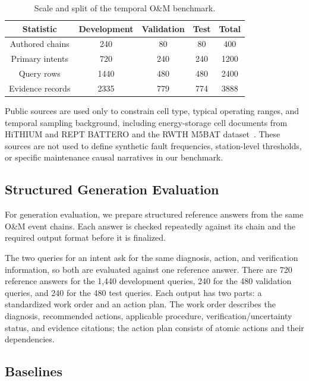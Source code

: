 \begin{table}[t]
\caption{Scale and split of the temporal O\&M benchmark.}
\label{tab:dataset_stats}
\centering
\small
\begin{tabular}{ccccc}
\toprule
Statistic & Development & Validation & Test & Total \\
\midrule
Authored chains & 240 & 80 & 80 & 400 \\
Primary intents & 720 & 240 & 240 & 1200 \\
Query rows & 1440 & 480 & 480 & 2400 \\
Evidence records & 2335 & 779 & 774 & 3888 \\
\bottomrule
\end{tabular}
\end{table}

Public sources are used only to constrain cell type, typical operating ranges, and temporal sampling background, including energy-storage cell documents from HiTHIUM and REPT BATTERO and the RWTH M5BAT dataset~\cite{hithium2023v11,hithium2024v33,rept2025,rwth2026m5bat}. These sources are not used to define synthetic fault frequencies, station-level thresholds, or specific maintenance causal narratives in our benchmark.

\subsection{Structured Generation Evaluation}

For generation evaluation, we prepare structured reference answers from the same O\&M event chains. Each answer is checked repeatedly against its chain and the required output format before it is finalized.

The two queries for an intent ask for the same diagnosis, action, and verification information, so both are evaluated against one reference answer. There are 720 reference answers for the 1,440 development queries, 240 for the 480 validation queries, and 240 for the 480 test queries. Each output has two parts: a standardized work order and an action plan. The work order describes the diagnosis, recommended actions, applicable procedure, verification/uncertainty status, and evidence citations; the action plan consists of atomic actions and their dependencies.

\subsection{Baselines}
\label{sec:baselines}

